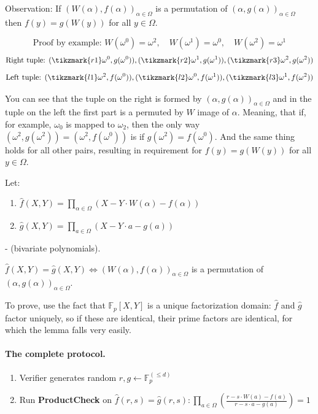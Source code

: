 \documentclass[../lecture-notes.tex]{subfiles}
\begin{document}
\begin{remark}
Observation: If \((W(\alpha), f(\alpha))_{\alpha \in \Omega}\) is a permutation of \((\alpha, g(\alpha))_{\alpha \in \Omega}\) then \(f(y) = g(W(y))\) for all \(y \in \Omega \).
\end{remark}

\begin{example}
\[
\text{Proof by example: } W(\omega^0) = \omega^2, \quad W(\omega^1) = \omega^0, \quad W(\omega^2) = \omega^1 
\]
\[
\text{Right tuple: } (\tikzmark{r1}\omega^0, g(\omega^0)), (\tikzmark{r2}\omega^1, g(\omega^1)), (\tikzmark{r3}\omega^2, g(\omega^2))
\]
\[
\text{Left tuple: } (\tikzmark{l1}\omega^2, f(\omega^0)), (\tikzmark{l2}\omega^0, f(\omega^1)), (\tikzmark{l3}\omega^1, f(\omega^2))
\]

You can see that the tuple on the right is formed by \((\alpha, g(\alpha))_{\alpha \in \Omega}\) and in the tuple on the left the first part is a permuted by \(W\) image of \(\alpha\). Meaning, that if, for example, \(\omega_0\) is mapped to \(\omega_2\), then the only way \((\omega^2, g(\omega^2)) = (\omega^2, f(\omega^0))\) is if \(g(\omega^2) = f(\omega^0)\). And the same thing holds for all other pairs, resulting in requirement for \(f(y) = g(W(y))\) for all \(y \in \Omega \).
\end{example}

\begin{lemma}
Let:
    \begin{enumerate}
        \item \(\hat{f}(X,Y) = \prod_{\alpha \in \Omega} (X - Y \cdot W(\alpha) - f(\alpha))\)
        \item \(\hat{g}(X,Y) = \prod_{a \in \Omega} (X - Y \cdot a - g(a))\)
    \end{enumerate}
- (bivariate polynomials).  

\(\hat{f}(X,Y) = \hat{g}(X,Y) \iff \left( W(\alpha), f(\alpha) \right)_{\alpha \in \Omega}\) is a permutation of \(\left( \alpha, g(\alpha) \right)_{\alpha \in \Omega}\).

To prove, use the fact that \(\mathbb{F}_p[X,Y]\) is a unique factorization domain: \(\hat{f}\) and \(\hat{g}\) factor uniquely, so if these are identical, their prime factors are identical, for which the lemma falls very easily.
\end{lemma}

\paragraph{The complete protocol.}
\begin{enumerate}
    \item Verifier generates random \(r, g \leftarrow\mathbb{F}_p^{(\leq d)} \)
    \item Run \textbf{ProductCheck} on \(\hat{f}(r, s) = \hat{g}(r, s): \prod_{a \in \Omega} \left( \frac{r - s \cdot W(a) - f(a)}{r - s \cdot a - g(a)} \right) = 1\)
\end{enumerate}
\end{document}
